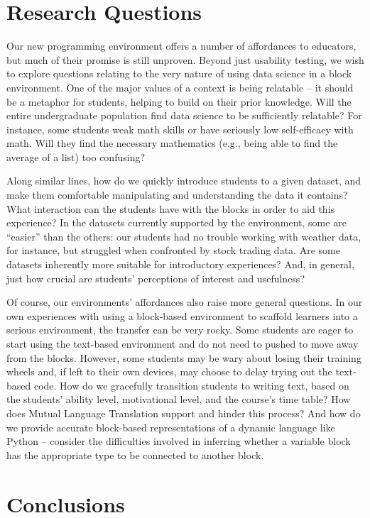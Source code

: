 \documentclass{sig-alternate}
\begin{document}
\section{Research Questions}

Our new programming environment offers a number of affordances to educators, but much of their promise is still unproven.
Beyond just usability testing, we wish to explore questions relating to the very nature of using data science in a block environment.
One of the major values of a context is being relatable -- it should be a metaphor for students, helping to build on their prior knowledge. Will the entire undergraduate population find data science to be sufficiently relatable? For instance, some students weak math skills or have seriously low self-efficacy with math. Will they find the necessary mathematics (e.g., being able to find the average of a list) too confusing?

Along similar lines, how do we quickly introduce students to a given dataset, and make them comfortable manipulating and understanding the data it contains?
What interaction can the students have with the blocks in order to aid this experience?
In the datasets currently supported by the environment, some are ``easier'' than the others: our students had no trouble working with weather data, for instance, but struggled when confronted by stock trading data.
Are some datasets inherently more suitable for introductory experiences?
And, in general, just how crucial are students' perceptions of interest and usefulness? 

Of course, our environments' affordances also raise more general questions.
In our own experiences with using a block-based environment to scaffold learners into a serious environment, the transfer can be very rocky.
Some students are eager to start using the text-based environment and do not need to pushed to move away from the blocks.
However, some students may be wary about losing their training wheels and, if left to their own devices, may choose to delay trying out the text-based code.
How do we gracefully transition students to writing text, based on the students' ability level, motivational level, and the course's time table?
How does Mutual Language Translation support and hinder this process?
And how do we provide accurate block-based representations of a dynamic language like Python -- consider the difficulties involved in inferring whether a variable block has the appropriate type to be connected to another block.

\section{Conclusions}
\end{document}
